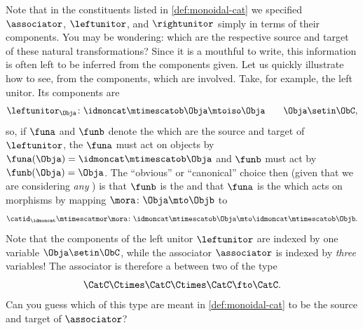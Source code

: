 \begin{remark}
    Note that in the constituents listed in \cref{def:monoidal-cat} we specified  $\associator$, $\leftunitor$, and $\rightunitor$ simply in terms of their components.
    You may be wondering: which  are the respective source and target of these natural transformations?
    Since it is a mouthful to write, this information is often left to be inferred from the components given.
    Let us quickly illustrate how to see, from the components, which  are involved.
    Take, for example, the left unitor.
    Its components are
    \begin{equation}
        \leftunitor_\Obja \colon \idmoncat\mtimescatob \Obja \mtoiso \Obja \quad \quad \Obja\setin \ObC,
    \end{equation}
    so, if $\funa$ and $\funb$ denote the  which are the source and target of $\leftunitor$, the  $\funa$ must act on objects by $\funa(\Obja) = \idmoncat \mtimescatob \Obja$ and $\funb$ must act by $\funb(\Obja) = \Obja$.
    The ``obvious'' or ``canonical'' choice then (given that we are considering \emph{any} ) is that $\funb$ is the  and that $\funa$ is the  which acts on morphisms by mapping $\mora \colon \Obja \mto \Objb$ to
    \begin{equation}
        \catid_\idmoncat \mtimescatmor \mora \colon \idmoncat\mtimescatob \Obja \mto \idmoncat\mtimescatob \Objb.
    \end{equation}
    Note that the components of the left unitor $\leftunitor$ are indexed by one variable $\Obja \setin \ObC$, while the associator $\associator$ is indexed by \emph{three} variables!
    The associator is therefore a  between two  of the type
    \begin{equation}
        \CatC \Ctimes \CatC \Ctimes \CatC \fto \CatC.
    \end{equation}
    Can you guess which  of this type are meant in \cref{def:monoidal-cat} to be the source and target of $\associator$?
\end{remark}

